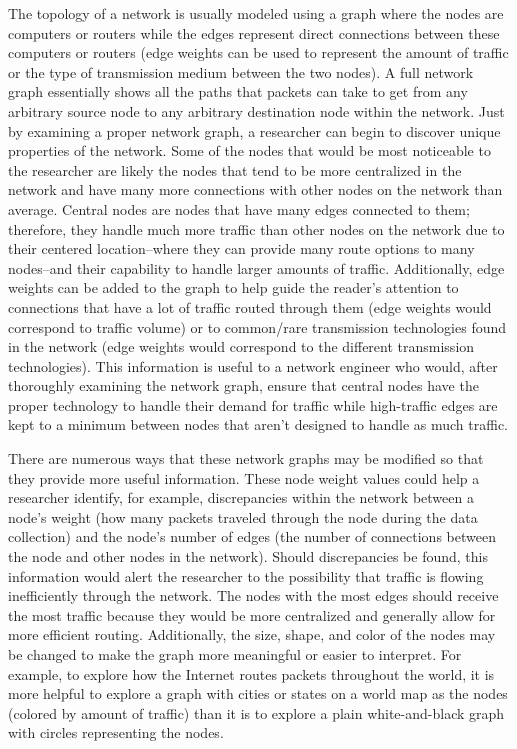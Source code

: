\documentclass{sigcomm-alternate}
\begin{document}
	The topology of a network is usually modeled using a graph where the nodes are computers or routers while the edges represent direct connections between these computers or routers (edge weights can be used to represent the amount of traffic or the type of transmission medium between the two nodes). A full network graph essentially shows all the paths that packets can take to get from any arbitrary source node to any arbitrary destination node within the network. Just by examining a proper network graph, a researcher can begin to discover unique properties of the network. Some of the nodes that would be most noticeable to the researcher are likely the nodes that tend to be more centralized in the network and have many more connections with other nodes on the network than average. Central nodes are nodes that have many edges connected to them; therefore, they handle much more traffic than other nodes on the network due to their centered location–where they can provide many route options to many nodes–and their capability to handle larger amounts of traffic. Additionally, edge weights can be added to the graph to help guide the reader's attention to connections that have a lot of traffic routed through them (edge weights would correspond to traffic volume) or to common/rare transmission technologies found in the network (edge weights would correspond to the different transmission technologies). This information is useful to a network engineer who would, after thoroughly examining the network graph, ensure that central nodes have the proper technology to handle their demand for traffic while high-traffic edges are kept to a minimum between nodes that aren't designed to handle as much traffic.
	
	There are numerous ways that these network graphs may be modified so that they provide more useful information.  These node weight values could help a researcher identify, for example, discrepancies within the network between a node's weight (how many packets traveled through the node during the data collection) and the node's number of edges (the number of connections between the node and other nodes in the network). Should discrepancies be found, this information would alert the researcher to the possibility that traffic is flowing inefficiently through the network. The nodes with the most edges should receive the most traffic because they would be more centralized and generally allow for more efficient routing. Additionally, the size, shape, and color of the nodes may be changed to make the graph more meaningful or easier to interpret. For example, to explore how the Internet routes packets throughout the world, it is more helpful to explore a graph with cities or states on a world map as the nodes (colored by amount of traffic) than it is to explore a plain white-and-black graph with circles representing the nodes. 
	
\end{document}
